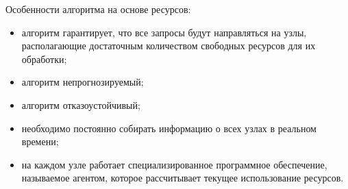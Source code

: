 Особенности алгоритма на основе ресурсов:
\begin{itemize}
	\item алгоритм гарантирует, что все запросы будут направляться на узлы, располагающие достаточным количеством свободных ресурсов для их обработки;
    \item алгоритм непрогнозируемый;
    \item алгоритм отказоустойчивый;
    \item необходимо постоянно собирать информацию о всех узлах в реальном времени;
    \item на каждом узле работает специализированное программное обеспечение, называемое агентом, которое рассчитывает текущее использование ресурсов.
\end{itemize}
